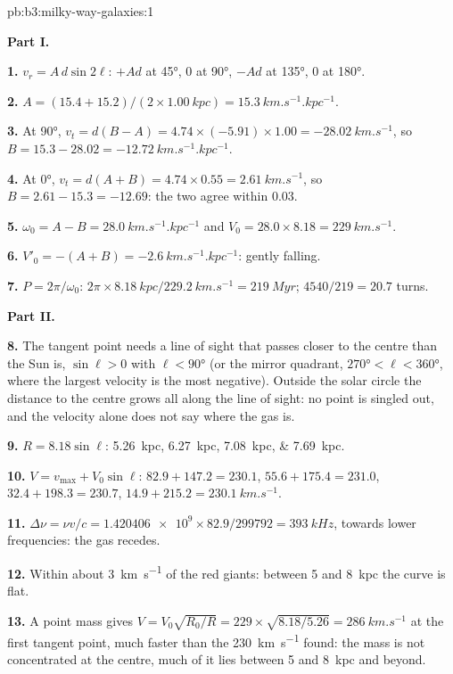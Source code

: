 \begin{solution}{pb:b3:milky-way-galaxies:1}

\textbf{Part I.}

\textbf{1.} $v_r = A\,d\sin2\ell$: $+A d$ at \ang{45}, 0 at \ang{90}, $-A d$ at
\ang{135}, 0 at \ang{180}.

\textbf{2.} $A = (15.4 + 15.2)/(2\times\qty{1.00}{kpc}) =
\qty{15.3}{km.s^{-1}.kpc^{-1}}$.

\textbf{3.} At \ang{90}, $v_t = d(B - A) = 4.74\times(-5.91)\times1.00 =
\qty{-28.02}{km.s^{-1}}$, so $B = 15.3 - 28.02 =
\qty{-12.72}{km.s^{-1}.kpc^{-1}}$.

\textbf{4.} At \ang{0}, $v_t = d(A + B) = 4.74\times0.55 =
\qty{2.61}{km.s^{-1}}$, so $B = 2.61 - 15.3 = \num{-12.69}$: the two
agree within \num{0.03}.

\textbf{5.} $\omega_0 = A - B = \qty{28.0}{km.s^{-1}.kpc^{-1}}$ and
$V_0 = 28.0\times8.18 = \qty{229}{km.s^{-1}}$.

\textbf{6.} $V'_0 = -(A + B) = \qty{-2.6}{km.s^{-1}.kpc^{-1}}$: gently falling.

\textbf{7.} $P = 2\pi/\omega_0$: $2\pi\times\qty{8.18}{kpc}/\qty{229.2}{km.s^{-1}}
= \qty{219}{Myr}$; $4540/219 = 20.7$ turns.

\textbf{Part II.}

\textbf{8.} The tangent point needs a line of sight that passes closer to the
centre than the Sun is, $\sin\ell > 0$ with $\ell < \ang{90}$ (or the
mirror quadrant, $\ang{270} < \ell < \ang{360}$, where the largest
velocity is the most negative). Outside the solar circle the distance
to the centre grows all along the line of sight: no point is singled
out, and the velocity alone does not say where the gas is.

\textbf{9.} $R = 8.18\sin\ell$: \qtylist{5.26;6.27;7.08;7.69}{kpc}.

\textbf{10.} $V = v_\mathrm{max} + V_0\sin\ell$: $82.9 + 147.2 = 230.1$,
$55.6 + 175.4 = 231.0$, $32.4 + 198.3 = 230.7$, $14.9 + 215.2 =
\qty{230.1}{km.s^{-1}}$.

\textbf{11.} $\Delta\nu = \nu v/c = \num{1.420406e9}\times82.9/299792 =
\qty{393}{kHz}$, towards lower frequencies: the gas recedes.

\textbf{12.} Within about \qty{3}{km.s^{-1}} of the red giants: between 5 and
\qty{8}{kpc} the curve is flat.

\textbf{13.} A point mass gives $V = V_0\sqrt{R_0/R} = 229\times\sqrt{8.18/5.26} =
\qty{286}{km.s^{-1}}$ at the first tangent point, much faster than the
\qty{230}{km.s^{-1}} found: the mass is not concentrated at the centre,
much of it lies between 5 and \qty{8}{kpc} and beyond.


\end{solution}
